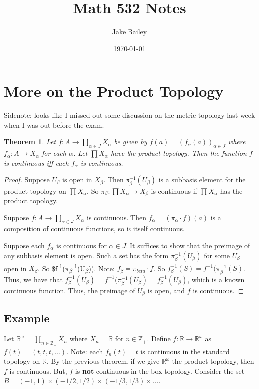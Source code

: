 \documentclass[11pt]{article}
\author{Jake Bailey}
\date{\today}
\title{Math 532 Notes}
\newtheorem{theorem}{Theorem}[section]
\begin{document}
\maketitle
\tableofcontents

\section{More on the Product Topology}
\label{sec:org48a1491}

Sidenote: looks like I missed out some discussion on the metric topology last
week when I was out before the exam. 

\begin{theorem}
Let \(f: A\rightarrow \prod\limits_{\alpha \in J} X_{\alpha}\) be given by \(f(a) =
(f_{\alpha}(a))_{\alpha \in J}\) where \(f_{\alpha}:A\rightarrow X_{\alpha}\) for
each \(\alpha\). Let \(\prod X_{\alpha}\) have the product topology. Then the
function \(f\) is continuous iff each \(f_{\alpha}\) is continuous. 
\end{theorem}
\begin{proof}
Suppose \(U_{\beta}\) is open in \(X_{\beta}\). Then \(\pi_{\beta}^{-1}(U_{\beta})\)
is a subbasis element for the product topology on \(\prod X_{\alpha}\). So
\(\pi_{\beta}: \prod X_{\alpha} \rightarrow X_{\beta}\) is continuous if \(\prod
X_{\alpha}\) has the product topology. 

Suppose \(f:A\rightarrow\prod\limits_{\alpha \in J}X_{\alpha}\) is continuous.
Then \(f_{\alpha} = (\pi_{\alpha}\cdot f)(a)\) is a composition of continuous
functions, so is itself continuous. 

Suppose each \(f_{\alpha}\) is continuous for \(\alpha \in J\). It suffices to show
that the preimage of any subbasis element is open. Such a set has the form
\(\pi_{\beta}^{-1}(U_{\beta})\) for some \(U_{\beta}\) open in \(X_{\beta}\). So
\$f\textsuperscript{-1}(\(\pi\)\textsubscript{\(\beta\)}\textsuperscript{-1}(U\textsubscript{\(\beta\)})). Note: \(f_{\beta} = \pi_{beta}\cdot f\). So
\(f^{-1}_{\beta}(S) = f^{-1}(\pi_{\beta}^{-1}(S)\). Thus, we have that
\(f^{-1}_{\beta}(U_{\beta}) = f^{-1}(\pi_{\beta}^{-1}(U_{\beta}) =
f^{-1}_{\beta}(U_{\beta})\), which is a known continuous function. Thus, the
preimage of \(U_{\beta}\) is open, and \(f\) is continuous. 
\end{proof}
\subsection{Example}
\label{sec:orgc1938e7}
Let \(\mathbb{R}^{\omega} = \prod\limits_{n \in \mathbb{Z}_+}X_n\) where \(X_n =
\mathbb{R}\) for \(n \in \mathbb{Z}_+\). Define \(f:
\mathbb{R}\rightarrow\mathbb{R}^{\omega}\) as \(f(t) = (t,t,t,\ldots)\). Note: each
\(f_n(t) = t\) is continuous in the standard topology on \(\mathbb{R}\). By the
previous theorem, if we give \(\mathbb{R}^{\omega}\) the product topology, then
\(f\) is continuous. But, \(f\) is \textbf{not} continuous in the box topology. Consider
the set \(B = (-1, 1)\times(-1/2, 1/2)\times(-1/3, 1/3)\times\ldots\). 
\end{document}
